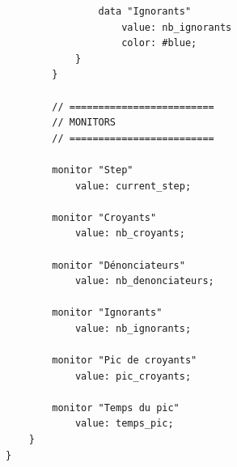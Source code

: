 \documentclass[11pt,a4paper]{article}
\begin{document}
\begin{small}
\begin{verbatim}
                data "Ignorants"
                    value: nb_ignorants
                    color: #blue;
            }
        }

        // =========================
        // MONITORS
        // =========================

        monitor "Step"
            value: current_step;

        monitor "Croyants"
            value: nb_croyants;

        monitor "Dénonciateurs"
            value: nb_denonciateurs;

        monitor "Ignorants"
            value: nb_ignorants;

        monitor "Pic de croyants"
            value: pic_croyants;

        monitor "Temps du pic"
            value: temps_pic;
    }
}
\end{verbatim}\end{small}
\end{document}
